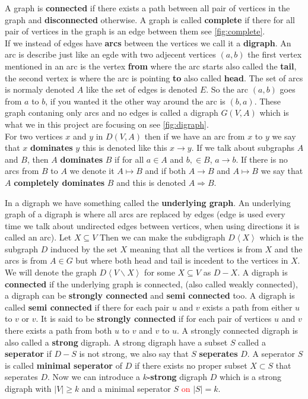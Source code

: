 A graph is \textbf{connected} if there exists a path between all pair of vertices in the graph and \textbf{disconnected} otherwise.
A graph is called \textbf{complete} if there for all pair of vertices in the graph is an edge between them see \autoref{fig:complete}.\\

If we instead of edges have \textbf{arcs} between the vertices we call it a \textbf{digraph}.
An arc is describe just like an egde with two adjecent vertices $(a,b)$ the first vertex mentioned in an arc is the vertex \textbf{from} where the arc starts also called the \textbf{tail}, the second vertex is where the arc is pointing \textbf{to} also called \textbf{head}. The set of arcs is normaly denoted $A$ like the set of edges is denoted $E$. 
So the arc $(a,b)$ goes from $a$ to $b$, if you wanted it the other way around the arc is $(b,a)$.
These graph contaning only arcs and no edges is called a digraph $G(V,A)$ which is what we in this project are focusing on see \autoref{fig:digraph}.\\
For two vertices $x$ and $y$ in $D(V,A)$ then if we have an arc from $x$ to $y$ we say that $x$ \textbf{dominates} $y$ this is denoted like this $x \rightarrow y$. If we talk about subgraphs $A$ and $B$, then $A$ \textbf{dominates} $B$ if for all $a\in A$ and $b,\in B$, $a \rightarrow b$. If there is no arcs from $B$ to $A$ we denote it $A\mapsto B$ and if both $A\rightarrow B$ and $A \mapsto B$ we say that $A$ \textbf{completely dominates} $B$ and this is denoted $A\Rightarrow B$. 

In a digraph we have something called the \textbf{underlying graph}. 
An underlying graph of a digraph is where all arcs are replaced by edges (edge is used every time we talk about undirected edges between vertices, when using directions it is called an arc).
Let $X \subseteq V$ Then we can make the subdigraph $D\left< X\right>$ which is the subgraph $D$ induced by the set $X$ meaning that all the vertices is from $X$ and the arcs is from $A\in G$ but where both head and tail is incedent to the vertices in $X$. We will denote the graph $D\left< V\backslash X\right>$ for some $X\subseteq V$ as $D-X$.
A digraph is \textbf{connected} if the underlying graph is connected, (also called weakly connected), a digraph can be \textbf{strongly connected} and \textbf{semi connected} too.
A digraph is called \textbf{semi connected} if there for each pair $u$ and $v$ exists a path from either $u$ to $v$ or $v$.  
It is said to be \textbf{strongly connected} if for each pair of vertices $u$ and $v$ there exists a path from both $u$ to $v$ and $v$ to $u$. A strongly connected digraph is also called a \textbf{strong} digraph. 
A strong digraph have a subset $S$ called a \textbf{seperator} if $D-S$ is not strong, we also say that $S$ \textbf{seperates} $D$. 
A seperator $S$ is called \textbf{minimal seperator} of $D$ if there exists no proper subset $X\subset S$ that seperates $D$.
Now we can introduce a \textbf{$k$-strong} digraph $D$ which is a strong digraph with $|V|\geq k$ and a minimal seperator $S$ \textcolor{red}{on} $|S|= k$.

